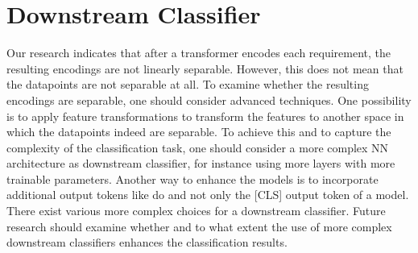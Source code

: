 \section{Downstream Classifier}
\label{chp:future_work:sec:downstream_classifier}
Our research indicates that after a transformer encodes each requirement, the resulting encodings are not linearly separable.
However, this does not mean that the datapoints are not separable at all.
To examine whether the resulting encodings are separable, one should consider advanced techniques.
One possibility is to apply feature transformations to transform the features to another space in which the datapoints indeed are separable.
To achieve this and to capture the complexity of the classification task, one should consider a more complex \ac{NN} architecture as downstream classifier, for instance using more layers with more trainable parameters.
Another way to enhance the models is to incorporate additional output tokens like \textcite{Gao:2019} do and not only the [CLS] output token of a model.
There exist various more complex choices for a downstream classifier.
Future research should examine whether and to what extent the use of more complex downstream classifiers enhances the classification results.
